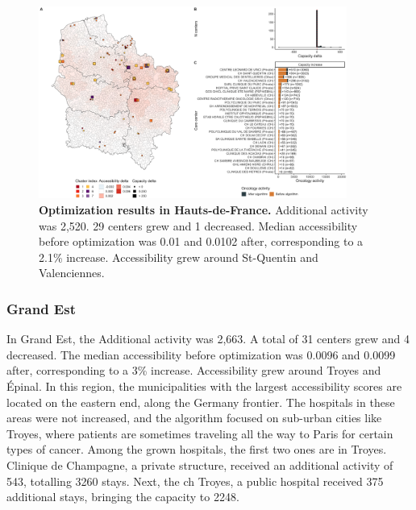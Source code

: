 \begin{figure}[h!]
    \includegraphics[width=0.9\textwidth]{images/camion/optim_region/optim_Hauts-de-France.png}
    \centering
    \caption{ \textbf{Optimization results in Hauts-de-France.} Additional
        activity was 2,520. 29 centers grew and 1 decreased. Median
        accessibility before optimization was 0.01 and 0.0102 after,
        corresponding to a 2.1\% increase. Accessibility grew around St-Quentin
        and Valenciennes. }
\end{figure}

\subsubsection{Grand Est}

In Grand Est, the Additional activity was 2,663. A total of 31 centers grew and 4
decreased. The median accessibility before optimization was 0.0096 and
0.0099 after, corresponding to a 3\% increase. Accessibility grew around
Troyes and Épinal. In this region, the municipalities with the largest accessibility
scores are located on the eastern end, along the Germany frontier. The hospitals
in these areas were not increased, and the algorithm focused on sub-urban
cities like Troyes, where patients are sometimes traveling all the way to Paris
for certain types of cancer. Among the grown hospitals, the first two ones are
in Troyes. Clinique de Champagne, a private structure, received an additional
activity of 543, totalling 3260 stays. Next, the \ac{ch} Troyes, a public hospital
received 375 additional stays, bringing the capacity to 2248.

